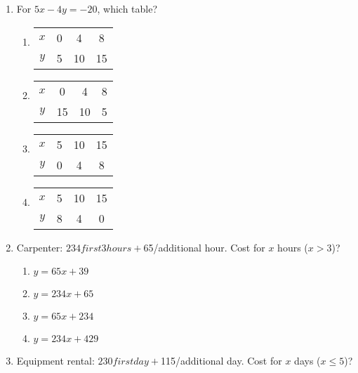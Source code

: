 \documentclass[12pt]{exam}
\begin{document}
\begin{enumerate}
\begin{center}
\begin{tikzpicture}[scale=0.4]
\end{tikzpicture}
\end{center}
    \item For $5x - 4y = -20$, which table?
    \begin{enumerate}[label=\Alph*)]
        \item 
            \begin{tabular}{|c|c|c|c|}
                \hline
                $x$ & 0 & 4 & 8 \\
                $y$ & 5 & 10 & 15 \\
                \hline
            \end{tabular}
        \item 
            \begin{tabular}{|c|c|c|c|}
                \hline
                $x$ & 0 & 4 & 8 \\
                $y$ & 15 & 10 & 5 \\
                \hline
            \end{tabular}
        \item 
            \begin{tabular}{|c|c|c|c|}
                \hline
                $x$ & 5 & 10 & 15 \\
                $y$ & 0 & 4 & 8 \\
                \hline
            \end{tabular}
        \item 
            \begin{tabular}{|c|c|c|c|}
                \hline
                $x$ & 5 & 10 & 15 \\
                $y$ & 8 & 4 & 0 \\
                \hline
            \end{tabular}
    \end{enumerate}
    \item Carpenter: $234 first 3 hours + $65/additional hour. Cost for $x$ hours ($x > 3$)?
    \begin{enumerate}[label=\Alph*)]
        \item $y = 65x + 39$
        \item $y = 234x + 65$
        \item $y = 65x + 234$
        \item $y = 234x + 429$
    \end{enumerate}
    \item Equipment rental: $230 first day + $115/additional day. Cost for $x$ days ($x \leq 5$)?

\end{enumerate}
\end{document}
